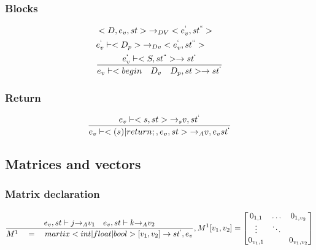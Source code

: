 \subsubsection{Blocks}
\begin{align*}
&<D,{ e }_{ v },st>{ \rightarrow  }_{ DV }<{ e }_{ v }^{ ` },{ st }^{ `` }>\\
&{ e }_{ v }^{ ` }\vdash <{ D }_{ p }>{ \rightarrow  }_{ Dv }<{ e }_{ v }^{ ` },{ st }^{ `` }>\\
&\frac { { e }_{ v }^{ ` }\vdash <S,{ st }^{ `` }>\rightarrow { st }^{ ` } }{ { e }_{ v }\vdash <begin\quad { D }_{ v }\quad { D }_{ p },st>\rightarrow { st }^{ ` } } 
\end{align*}

\subsubsection{Return}
\begin{equation}
	\frac { { e }_{ v }\vdash <{ s },st>{ \rightarrow  }_{ s }v,{ st }^{ ` } }{ { e }_{ v }\vdash <(s)|return;,{ e }_{ v },st>{ \rightarrow  }_{ A }v,{ e }_{ v }{ st }^{ ` } } 
\end{equation}


\subsection*{Matrices and vectors} 
\subsubsection{Matrix declaration}
\begin{equation}
	\frac { { e }_{ v },st\vdash j{ \rightarrow  }_{ A }{ v }_{ 1 }\quad { e }_{ v },st\vdash k{ \rightarrow  }_{ A }{ v }_{ 2 } }{ { M }^{ 1 }\quad =\quad martix<int|float|bool>[{ v }_{ 1 },{ v }_{ 2 }]\rightarrow { st }^{ ` },{ e }_{ v } } ,{ M }^{ 1 }[{ v }_{ 1 },{ v }_{ 2 }]=\begin{bmatrix} { { 0 }_{ 1,1 } } & \dots  & { 0 }_{ { 1,{ v }_{ 2 } } } \\ \vdots  & \ddots  &  \\ { 0 }_{ { v }_{ 1 },1 } &  & { 0 }_{ { v }_{ 1 },{ v }_{ 2 } } \end{bmatrix}
\end{equation}

